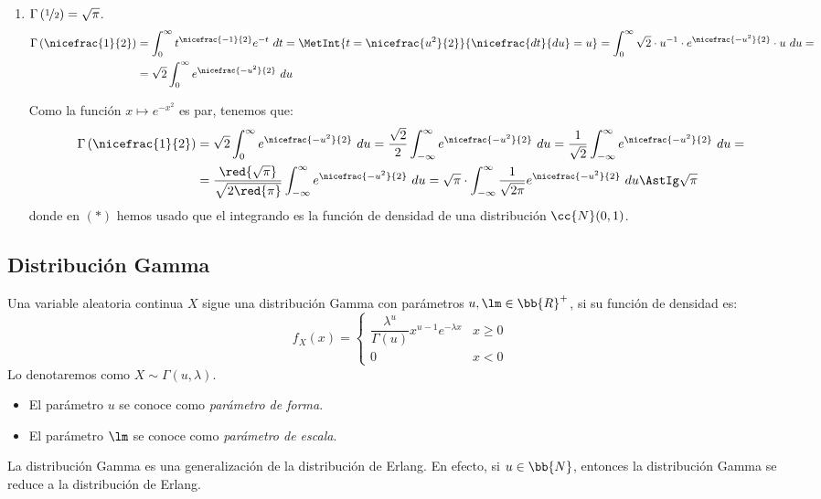\begin{enumerate}
    \item $\Gamma\left(\nicefrac{1}{2}\right) = \sqrt{\pi}$. \label{prop:gamma5}
    \begin{align*}
        \Gamma\left(\nicefrac{1}{2}\right) &= \int_{0}^{\infty} t^{\nicefrac{-1}{2}}e^{-t}~dt
        = \MetInt{t = \nicefrac{u^2}{2}}{\nicefrac{dt}{du} = u}
        = \int_{0}^{\infty}\sqrt{2}\cdot u^{-1}\cdot  e^{\nicefrac{-u^2}{2}}\cdot u~du
        =\\&= \sqrt{2} \int_{0}^{\infty} e^{\nicefrac{-u^2}{2}}~du
    \end{align*}

    Como la función $x\mapsto e^{-x^2}$ es par, tenemos que:
    \begin{align*}
        \Gamma\left(\nicefrac{1}{2}\right) &= \sqrt{2} \int_{0}^{\infty} e^{\nicefrac{-u^2}{2}}~du
        = \dfrac{\sqrt{2}}{2} \int_{-\infty}^{\infty} e^{\nicefrac{-u^2}{2}}~du
        = \dfrac{1}{\sqrt{2}} \int_{-\infty}^{\infty} e^{\nicefrac{-u^2}{2}}~du
        =\\&= \dfrac{\red{\sqrt{\pi}}}{\sqrt{2\red{\pi}}} \int_{-\infty}^{\infty} e^{\nicefrac{-u^2}{2}}~du
        = \sqrt{\pi}\cdot \int_{-\infty}^{\infty} \dfrac{1}{\sqrt{2\pi}} e^{\nicefrac{-u^2}{2}}~du
        \AstIg \sqrt{\pi}
    \end{align*}
    donde en $(\ast)$ hemos usado que el integrando es la función de densidad de una distribución $\cc{N}(0,1)$.
\end{enumerate}

\subsection{Distribución Gamma}

\begin{definicion}
    Una variable aleatoria continua $X$ sigue una distribución Gamma con parámetros $u,\lm\in \bb{R}^+$,
    si su función de densidad es:
    \begin{equation*}
        f_X(x) = \begin{cases}
            \dfrac{\lambda^u}{\Gamma(u)}x^{u-1}e^{-\lambda x} & x\geq 0\\
            0 & x<0
        \end{cases}
    \end{equation*}
    Lo denotaremos como $X\sim \Gamma(u,\lambda)$.
    \begin{itemize}
        \item El parámetro $u$ se conoce como \emph{parámetro de forma}.
        \item El parámetro $\lm$ se conoce como \emph{parámetro de escala}.
    \end{itemize}
\end{definicion}
\begin{observacion}
    La distribución Gamma es una generalización de la distribución de Erlang.
    En efecto, si $u\in \bb{N}$, entonces la distribución Gamma se reduce a la distribución de Erlang.
\end{observacion}

